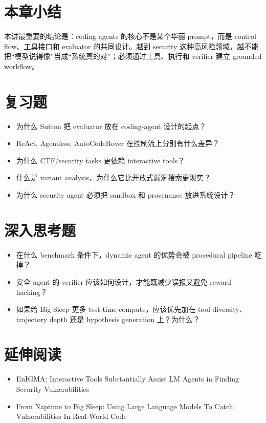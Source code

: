 \documentclass[a4paper]{article}
\begin{document}
\section{本章小结}
本讲最重要的结论是：coding agents 的核心不是某个华丽 prompt，而是 control flow、工具接口和 evaluator 的共同设计。越到 security 这种高风险领域，越不能把“模型说得像”当成“系统真的对”；必须通过工具、执行和 verifier 建立 grounded workflow。

\section{复习题}
\begin{itemize}
\item 为什么 Sutton 把 evaluator 放在 coding-agent 设计的起点？
\item ReAct, Agentless, AutoCodeRover 在控制流上分别有什么差异？
\item 为什么 CTF/security tasks 更依赖 interactive tools？
\item 什么是 variant analysis，为什么它比开放式漏洞搜索更现实？
\item 为什么 security agent 必须把 sandbox 和 provenance 放进系统设计？
\end{itemize}

\section{深入思考题}
\begin{itemize}
\item 在什么 benchmark 条件下，dynamic agent 的优势会被 procedural pipeline 吃掉？
\item 安全 agent 的 verifier 应该如何设计，才能既减少误报又避免 reward hacking？
\item 如果给 Big Sleep 更多 test-time compute，应该优先加在 tool diversity、trajectory depth 还是 hypothesis generation 上？为什么？
\end{itemize}

\section{延伸阅读}
\begin{itemize}
\item EnIGMA: Interactive Tools Substantially Assist LM Agents in Finding Security Vulnerabilities
\item From Naptime to Big Sleep: Using Large Language Models To Catch Vulnerabilities In Real-World Code
\end{itemize}
\end{document}
